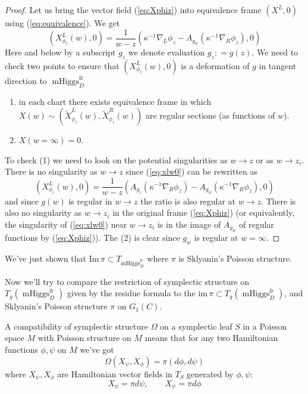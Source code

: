 \documentclass[11pt, oneside, reqno]{amsart}
\theoremstyle{definition} \newtheorem{definition}{Definition}[section]
\theoremstyle{definition} \newtheorem{remark}[definition]{Remark}
\theoremstyle{definition} \newtheorem{remarks}[definition]{Remarks}
\theoremstyle{definition} \newtheorem{question}[definition]{Question}
\theoremstyle{definition} \newtheorem*{note}{Note}
\theoremstyle{definition} \newtheorem{example}[definition]{Example}
\theoremstyle{definition} \newtheorem{examples}[definition]{Examples}
\DeclareMathOperator{\mhiggs}{mHiggs}
\newcommand{\fr}{\mathrm{fr}}
\begin{document}
\begin{proof}
  Let us bring the vector field (\ref{eq:Xphiz}) into equivalence frame $(X^{L}, 0)$ using
  (\ref{eq:equivalence}). We get
  \begin{equation}
\label{eq:xlw0}
(X^L_{\phi_z} (w) , 0) =  \frac{1}{w - z} ( \kappa^{-1} \nabla_{L} \phi_z  - A_{g_{w}} (\kappa^{-1}\nabla_{R} \phi_{z}), 0 )
  \end{equation}
Here and below by a subscript $g_{z}$ we denote evaluation $g_{z}: = g(z)$. 
  We need to check two points to ensure that $(X^L_{\phi_z} (w) , 0) $ is a deformation
  of $g$ in tangent direction to $\mhiggs^{\fr}_{D}$
  \begin{enumerate}
  \item in each chart there exists equivalence frame in which $X(w) \sim (\tilde X_{\phi_{z}}^{L}(w), \tilde X_{\phi_{z}}^{R}(w))$  are regular sections (as functions of $w$).
  \item $X(w = \infty) = 0$.
  \end{enumerate}

  To check (1) we need to look on the potential singularities as $w \to z$ or as $w \to z_i$.
  There is no singularity as $w \to z$ since (\ref{eq:xlw0}) can be rewritten
  as
  \begin{equation}
\label{eq:sklyanin-left}
(X^L_{\phi_z} (w) , 0)  =     \frac{1}{w - z} ( A_{g_z}( \kappa^{-1} \nabla_{R} \phi_z)  - A_{g_{w}} (\kappa^{-1}\nabla_{R} \phi_{z}),0)
  \end{equation}
  and since $g(w)$ is regular in $w \to z$ the ratio is also regular at $w \to z$.
  There is also no singularity as $w \to z_i$ in the original frame (\ref{eq:Xphiz}) 
  (or equivalently, the singularity of (\ref{eq:xlw0}) near $w \to z_i$ 
  is in the image of $A_{g_{w}}$ of regular functions by (\ref{eq:Xphiz})).
 The (2) is clear since $g_{w}$ is regular at $w = \infty$. 
\end{proof}

We've just shown that $\mathrm{Im} \, \pi \subset T_{\mhiggs^{\fr}_{D}}$ where
$\pi$ is Sklyanin's Poisson structure. 

Now we'll try to compare the restriction of symplectic
structure on $T_{g}(\mhiggs^{\fr}_{D})$ given by the residue formula to the $\mathrm{im} \, \pi
\subset T_{g}(\mhiggs^{\fr}_D)$, and Sklyanin's Poisson structure $\pi$ on $G_1(C)$. 

 A compatibility of symplectic structure $\Omega$ on a symplectic leaf $S$ in a Poisson space $M$
 with Poisson structure on $M$  means that for any two Hamiltonian functions $\phi, \psi$ on $M$
 we've got
 \begin{equation}
\label{eq:compatibility}
   \Omega(X_{\psi}, X_{\phi}) = \pi (d\phi, d \psi)
 \end{equation}
 where $X_{\psi}, X_{\phi}$ are Hamiltonian vector fields in $T_{S}$ generated by $\phi, \psi$:
 \begin{equation}
   X_{\psi} = \pi d \psi, \qquad X_{\psi} = \pi d \phi 
 \end{equation}
\end{document}
